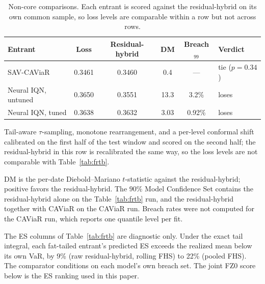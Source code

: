 \documentclass[11pt]{article}
\theoremstyle{remark}
\begin{document}
\begin{table}[htbp]
\centering
\begin{threeparttable}
\caption{Non-core comparisons. Each entrant is scored against the residual-hybrid on its own common sample, so loss levels are comparable within a row but not across rows.}
\label{tab:noncore}
\footnotesize\setlength{\tabcolsep}{5pt}
\begin{tabular}{lccccl}
\toprule
Entrant & Loss & Residual-hybrid & DM & Breach$_{99}$ & Verdict \\
\midrule
SAV-CAViaR & 0.3461 & 0.3460 & 0.4 & --- & tie ($p=0.34$) \\
Neural IQN, untuned & 0.3650 & 0.3551 & 13.3 & 3.2\% & loses \\
Neural IQN, tuned\tnote{a} & 0.3638 & 0.3632 & 3.03 & 0.92\% & loses \\
\bottomrule
\end{tabular}
\begin{tablenotes}[flushleft]\footnotesize
\item[a] Tail-aware $\tau$-sampling, monotone rearrangement, and a per-level conformal shift calibrated on the first half of the test window and scored on the second half; the residual-hybrid in this row is recalibrated the same way, so the loss levels are not comparable with Table~\ref{tab:frtb}.
\item DM is the per-date Diebold--Mariano $t$-statistic against the residual-hybrid; positive favors the residual-hybrid. The $90\%$ Model Confidence Set contains the residual-hybrid alone on the Table~\ref{tab:frtb} run, and the residual-hybrid together with CAViaR on the CAViaR run. Breach rates were not computed for the CAViaR run, which reports one quantile level per fit.
\end{tablenotes}
\end{threeparttable}
\end{table}
The ES columns of Table~\ref{tab:frtb} are diagnostic only. Under the exact tail integral, each fat-tailed entrant's predicted ES exceeds the realized mean below its own VaR, by 9\% (raw residual-hybrid, rolling FHS) to 22\% (pooled FHS). The comparator conditions on each model's own breach set. The joint FZ0 score below is the ES ranking used in this paper.
\end{document}
